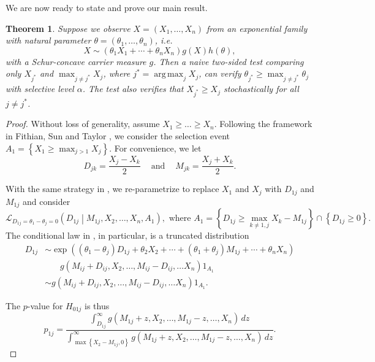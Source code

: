 \documentclass[11pt]{article}
\DeclareMathOperator*{\argmax}{arg\,max}
\newtheorem{theorem}{Theorem}
\begin{document}
We are now ready to state and prove our main result.

\begin{theorem}
Suppose we observe $X = \left(X_1, \ldots, X_n\right)$ from an exponential family with natural parameter $\theta = \left(\theta_1, \ldots, \theta_n\right)$, i.e.
$$X \sim \left(\theta_1 X_1 + \cdots + \theta_n X_n\right) g\left(X\right) h\left(\theta\right),$$
with a Schur-concave carrier measure $g$. Then a naive two-sided test comparing only $X_{j^*}$ and $\max_{j \ne j^*} X_j$, where $j^* = \argmax_{j} X_j$, can verify $\theta_{j^*} \ge \max_{j \ne j^*} \theta_{j}$ with selective level $\alpha$. The test also verifies that $X_{j^*} \ge X_j$ stochastically for all $j \ne j^*$.
\label{thm:main_result}
\end{theorem}

\begin{proof}

Without loss of generality, assume $X_1 \ge \ldots \ge X_n$. Following the framework in Fithian, Sun and Taylor \cite{Fithian:2014ws}, we consider the selection event $A_1 = \left\{X_1 \ge \max_{j > 1} X_j\right\}$. For convenience, we let
$$D_{jk} = \frac{X_j - X_k}{2} ~~~~ \text{ and } ~~~~ M_{jk} = \frac{X_j + X_k}{2}.$$

With the same strategy in , we re-parametrize to replace $X_1$ and $X_j$ with $D_{1j}$ and $M_{1j}$ and consider
\begin{equation}
\mathcal{L}_{D_{1j} = \theta_1 - \theta_j = 0} \left(D_{1j} \middle| M_{1j}, X_2, \ldots, X_n, A_1\right), \text{ where } A_1 = \left\{D_{1j} \ge \max_{k \ne 1, j} X_k - M_{1j}\right\} \cap \left\{D_{1j} \ge 0\right\}.
\label{eqn:cond_law}
\end{equation}
The conditional law in , in particular, is a truncated distribution
\begin{align*}
D_{1j} & \sim \exp\left(\left(\theta_1 - \theta_j\right) D_{1j} + \theta_2 X_2 + \cdots + \left(\theta_1 + \theta_j\right) M_{1j} + \cdots + \theta_n X_n \right) \\
& ~~~~~~~~ g\left(M_{ij} + D_{ij}, X_2, \ldots, M_{ij} - D_{ij}, \ldots X_n\right) 1_{A_1} \\
& \sim g\left(M_{ij} + D_{ij}, X_2, \ldots, M_{ij} - D_{ij}, \ldots X_n\right) 1_{A_1}.
\end{align*}

The $p$-value for $H_{01j}$ is thus
\begin{equation}
p_{1j} = \frac{\int_{D_{1j}}^\infty g\left(M_{1j} + z, X_2, \ldots, M_{1j} - z, \ldots, X_n\right) \,dz}{\int_{\max\left\{X_2 - M_{1j}, 0\right\}}^\infty g\left(M_{1j} + z, X_2, \ldots, M_{1j} - z, \ldots, X_n\right) \,dz}.
\label{eqn:p1j}
\end{equation}


\end{proof}
\end{document}
